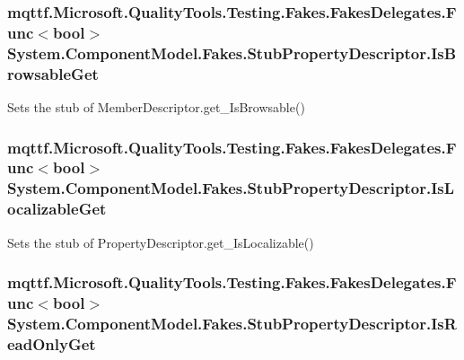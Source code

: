 \hypertarget{class_system_1_1_component_model_1_1_fakes_1_1_stub_property_descriptor_a7e4d6218927b619eedea68cc869c4aca}{
\subsubsection[{Is\-Browsable\-Get}]{\setlength{\rightskip}{0pt plus 5cm}mqttf.\-Microsoft.\-Quality\-Tools.\-Testing.\-Fakes.\-Fakes\-Delegates.\-Func$<$bool$>$ System.\-Component\-Model.\-Fakes.\-Stub\-Property\-Descriptor.\-Is\-Browsable\-Get}}\label{class_system_1_1_component_model_1_1_fakes_1_1_stub_property_descriptor_a7e4d6218927b619eedea68cc869c4aca}


Sets the stub of Member\-Descriptor.\-get\-\_\-\-Is\-Browsable()

\hypertarget{class_system_1_1_component_model_1_1_fakes_1_1_stub_property_descriptor_aa303d3b6ae5376d5a493ee6f5462c080}{
\subsubsection[{Is\-Localizable\-Get}]{\setlength{\rightskip}{0pt plus 5cm}mqttf.\-Microsoft.\-Quality\-Tools.\-Testing.\-Fakes.\-Fakes\-Delegates.\-Func$<$bool$>$ System.\-Component\-Model.\-Fakes.\-Stub\-Property\-Descriptor.\-Is\-Localizable\-Get}}\label{class_system_1_1_component_model_1_1_fakes_1_1_stub_property_descriptor_aa303d3b6ae5376d5a493ee6f5462c080}


Sets the stub of Property\-Descriptor.\-get\-\_\-\-Is\-Localizable()

\hypertarget{class_system_1_1_component_model_1_1_fakes_1_1_stub_property_descriptor_a5a5d295228dfc199d4b78fac6ad7d5e4}{
\subsubsection[{Is\-Read\-Only\-Get}]{\setlength{\rightskip}{0pt plus 5cm}mqttf.\-Microsoft.\-Quality\-Tools.\-Testing.\-Fakes.\-Fakes\-Delegates.\-Func$<$bool$>$ System.\-Component\-Model.\-Fakes.\-Stub\-Property\-Descriptor.\-Is\-Read\-Only\-Get}}\label{class_system_1_1_component_model_1_1_fakes_1_1_stub_property_descriptor_a5a5d295228dfc199d4b78fac6ad7d5e4}


